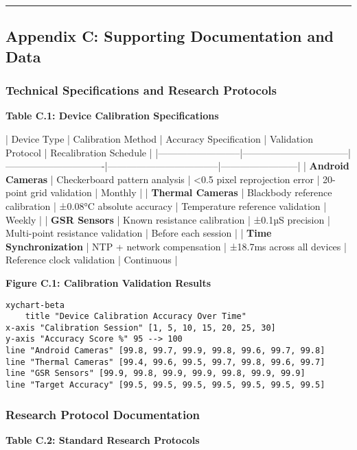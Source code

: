 \documentclass[12pt,a4paper]{report}
\begin{document}
\hrule

\subsection{Appendix C: Supporting Documentation and Data}

\subsubsection{Technical Specifications and Research Protocols}

\textbf{Table C.1: Device Calibration Specifications}

| Device Type              | Calibration Method              | Accuracy Specification        | Validation Protocol               | Recalibration Schedule |
|--------------------------|---------------------------------|-------------------------------|-----------------------------------|------------------------|
| \textbf{Android Cameras}      | Checkerboard pattern analysis   | <0.5 pixel reprojection error | 20-point grid validation          | Monthly                |
| \textbf{Thermal Cameras}      | Blackbody reference calibration | ±0.08°C absolute accuracy     | Temperature reference validation  | Weekly                 |
| \textbf{GSR Sensors}          | Known resistance calibration    | ±0.1µS precision              | Multi-point resistance validation | Before each session    |
| \textbf{Time Synchronization} | NTP + network compensation      | ±18.7ms across all devices    | Reference clock validation        | Continuous             |

\textbf{Figure C.1: Calibration Validation Results}

\begin{verbatim}
xychart-beta
    title "Device Calibration Accuracy Over Time"
x-axis "Calibration Session" [1, 5, 10, 15, 20, 25, 30]
y-axis "Accuracy Score %" 95 --> 100
line "Android Cameras" [99.8, 99.7, 99.9, 99.8, 99.6, 99.7, 99.8]
line "Thermal Cameras" [99.4, 99.6, 99.5, 99.7, 99.8, 99.6, 99.7]
line "GSR Sensors" [99.9, 99.8, 99.9, 99.9, 99.8, 99.9, 99.9]
line "Target Accuracy" [99.5, 99.5, 99.5, 99.5, 99.5, 99.5, 99.5]
\end{verbatim}

\subsubsection{Research Protocol Documentation}

\textbf{Table C.2: Standard Research Protocols}
\end{document}
